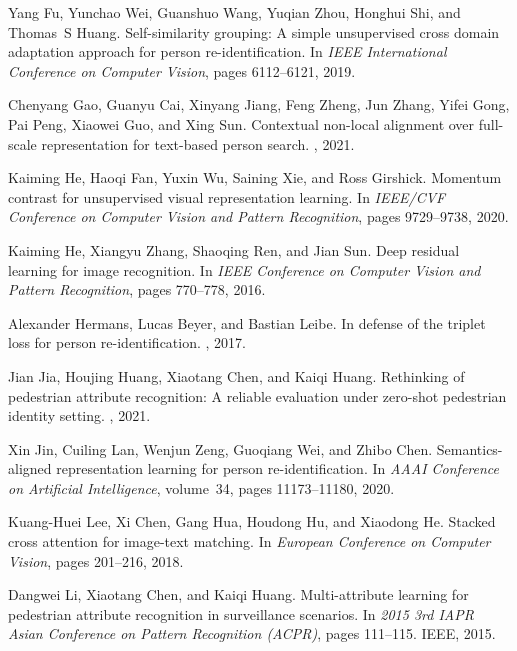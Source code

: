 \documentclass[10pt,twocolumn,letterpaper]{article}
\begin{document}
\begin{thebibliography}{10}
Yang Fu, Yunchao Wei, Guanshuo Wang, Yuqian Zhou, Honghui Shi, and Thomas~S
  Huang.
\newblock Self-similarity grouping: A simple unsupervised cross domain
  adaptation approach for person re-identification.
\newblock In {\em IEEE International Conference on Computer Vision}, pages
  6112--6121, 2019.

Chenyang Gao, Guanyu Cai, Xinyang Jiang, Feng Zheng, Jun Zhang, Yifei Gong, Pai
  Peng, Xiaowei Guo, and Xing Sun.
\newblock Contextual non-local alignment over full-scale representation for
  text-based person search.
, 2021.

Kaiming He, Haoqi Fan, Yuxin Wu, Saining Xie, and Ross Girshick.
\newblock Momentum contrast for unsupervised visual representation learning.
\newblock In {\em IEEE/CVF Conference on Computer Vision and Pattern
  Recognition}, pages 9729--9738, 2020.

Kaiming He, Xiangyu Zhang, Shaoqing Ren, and Jian Sun.
\newblock Deep residual learning for image recognition.
\newblock In {\em IEEE Conference on Computer Vision and Pattern Recognition},
  pages 770--778, 2016.

Alexander Hermans, Lucas Beyer, and Bastian Leibe.
\newblock In defense of the triplet loss for person re-identification.
, 2017.

Jian Jia, Houjing Huang, Xiaotang Chen, and Kaiqi Huang.
\newblock Rethinking of pedestrian attribute recognition: A reliable evaluation
  under zero-shot pedestrian identity setting.
, 2021.

Xin Jin, Cuiling Lan, Wenjun Zeng, Guoqiang Wei, and Zhibo Chen.
\newblock Semantics-aligned representation learning for person
  re-identification.
\newblock In {\em AAAI Conference on Artificial Intelligence}, volume~34, pages
  11173--11180, 2020.

Kuang-Huei Lee, Xi Chen, Gang Hua, Houdong Hu, and Xiaodong He.
\newblock Stacked cross attention for image-text matching.
\newblock In {\em European Conference on Computer Vision}, pages 201--216,
  2018.

Dangwei Li, Xiaotang Chen, and Kaiqi Huang.
\newblock Multi-attribute learning for pedestrian attribute recognition in
  surveillance scenarios.
\newblock In {\em 2015 3rd IAPR Asian Conference on Pattern Recognition
  (ACPR)}, pages 111--115. IEEE, 2015.


\end{thebibliography}
\end{document}
